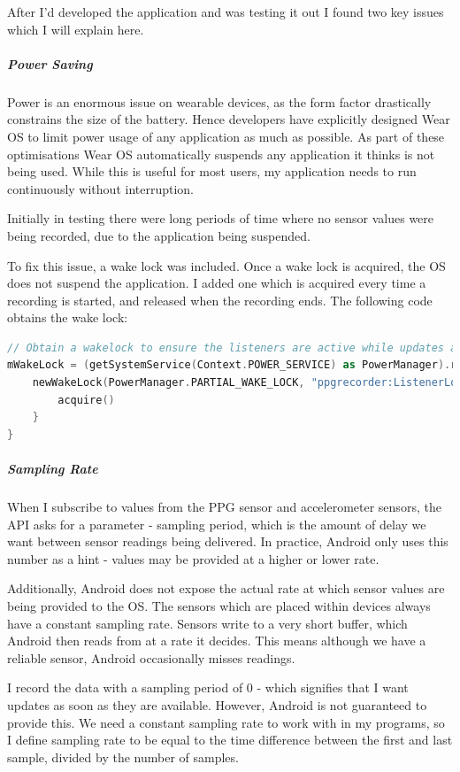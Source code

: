 \documentclass[12pt,a4paper,twoside,openright]{report}
\begin{document}
After I'd developed the application and was testing it out I found two key
issues which I will explain here.

\subparagraph{Power Saving}

Power is an enormous issue on wearable devices, as the form factor drastically
constrains the size of the battery. Hence developers have explicitly designed
Wear OS to limit power usage of any application as much as possible. 
As part of these optimisations Wear OS automatically suspends any application
it thinks is not being used. While this is useful for most users, my
application needs to run continuously without interruption.

Initially in testing there were long periods of time where no sensor values
were being recorded, due to the application being suspended.

To fix this issue, a wake lock was included. Once a wake lock is acquired, the
OS does not suspend the application. I added one which is acquired every time
a recording is started, and released when the recording ends. The following
code obtains the wake lock:

\begin{lstlisting}[language=Kotlin]
// Obtain a wakelock to ensure the listeners are active while updates are being provided
mWakeLock = (getSystemService(Context.POWER_SERVICE) as PowerManager).run {
	newWakeLock(PowerManager.PARTIAL_WAKE_LOCK, "ppgrecorder:ListenerLock").apply {
		acquire()
	}
}
\end{lstlisting}

\subparagraph{Sampling Rate}

When I subscribe to values from the PPG sensor and accelerometer sensors, the
API asks for a parameter - sampling period, which is the amount of delay we
want between sensor readings being delivered. In practice, Android only uses
this number as a hint - values may be provided at a higher or lower rate.

Additionally, Android does not expose the actual rate at which sensor values
are being provided to the OS. The sensors which are placed within devices
always have a constant sampling rate. Sensors write to a very short buffer,
which Android then reads from at a rate it decides. This means although we
have a reliable sensor, Android occasionally misses readings.

I record the data with a sampling period of 0 - which signifies that I want
updates as soon as they are available. However, Android is not guaranteed to
provide this. We need a constant sampling rate to work with in my programs, so I 
define sampling rate to be equal to the time difference
between the first and last sample, divided by the number of samples.
\end{document}
